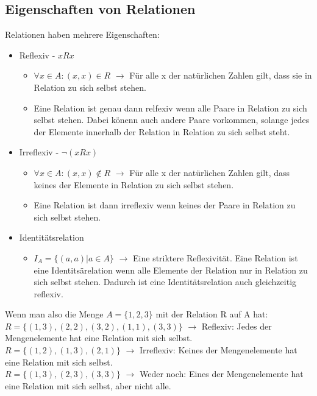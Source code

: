 \documentclass{article}
\begin{document}
	 \subsection{Eigenschaften von Relationen}
	 Relationen haben mehrere Eigenschaften:
	 \begin{itemize}
	 	\item{Reflexiv - $xRx$}
	 	\begin{itemize}
	 		\item{$\forall x\in A:(x,x)\in R$ $\to$ Für alle x der natürlichen Zahlen gilt, dass sie  in Relation zu sich selbst stehen.}
	 		\item{Eine Relation ist genau dann relfexiv wenn alle Paare in Relation zu sich selbst stehen. Dabei könenn auch andere Paare vorkommen, solange jedes der Elemente innerhalb der Relation in Relation zu sich selbst steht.}
	 	\end{itemize}
	 	\item{Irreflexiv - $\neg (xRx)$}
	 	\begin{itemize}
	 		\item{$\forall x\in A:(x,x)\notin R$ $\to$ Für alle x der natürlichen Zahlen gilt, dass keines der Elemente in Relation zu sich selbst stehen.}
	 		\item{Eine Relation ist dann irreflexiv wenn keines der Paare in Relation zu sich selbst stehen.}
	 	\end{itemize}
	 	\item{Identitätsrelation}
	 	\begin{itemize}
	 		\item{$I_A=\{(a,a)|a\in A\}$ $\to$ Eine striktere Reflexivität. Eine Relation ist eine Identitsärelation wenn alle Elemente der Relation nur in Relation zu sich selbst stehen. Dadurch ist eine Identitätsrelation auch gleichzeitig reflexiv.}
	 	\end{itemize}
	 \end{itemize}
	 Wenn man also die Menge $A=\{1,2,3\}$ mit der Relation R auf A hat: \\
	 $R=\{(1,3),(2,2),(3,2),(1,1),(3,3)\}$ $\to$ Reflexiv: Jedes der Mengenelemente hat eine Relation mit sich selbst.\\
	 $R=\{(1,2),(1,3),(2,1)\}$ $\to$ Irreflexiv: Keines der Mengenelemente hat eine Relation mit sich selbst.\\
	 $R=\{(1,3),(2,3),(3,3)\}$ $\to$ Weder noch: Eines der Mengenelemente hat eine Relation mit sich selbst, aber nicht alle.\\
\end{document}
